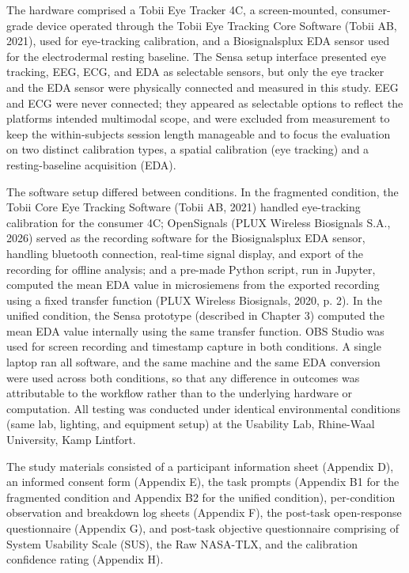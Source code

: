 \documentclass[
]{article}
\begin{document}
The hardware comprised a Tobii Eye Tracker 4C, a screen-mounted, consumer-grade device operated through the Tobii Eye Tracking Core Software (Tobii AB, 2021), used for eye-tracking calibration, and a Biosignalsplux EDA sensor used for the electrodermal resting baseline. The Sensa setup interface presented eye tracking, EEG, ECG, and EDA as selectable sensors, but only the eye tracker and the EDA sensor were physically connected and measured in this study. EEG and ECG were never connected; they appeared as selectable options to reflect the platform\textquotesingle s intended multimodal scope, and were excluded from measurement to keep the within-subjects session length manageable and to focus the evaluation on two distinct calibration types, a spatial calibration (eye tracking) and a resting-baseline acquisition (EDA).

The software setup differed between conditions. In the fragmented condition, the Tobii Core Eye Tracking Software (Tobii AB, 2021) handled eye-tracking calibration for the consumer 4C; OpenSignals (PLUX Wireless Biosignals S.A., 2026) served as the recording software for the Biosignalsplux EDA sensor, handling bluetooth connection, real-time signal display, and export of the recording for offline analysis; and a pre-made Python script, run in Jupyter, computed the mean EDA value in microsiemens from the exported recording using a fixed transfer function (PLUX Wireless Biosignals, 2020, p. 2). In the unified condition, the Sensa prototype (described in Chapter 3) computed the mean EDA value internally using the same transfer function. OBS Studio was used for screen recording and timestamp capture in both conditions. A single laptop ran all software, and the same machine and the same EDA conversion were used across both conditions, so that any difference in outcomes was attributable to the workflow rather than to the underlying hardware or computation. All testing was conducted under identical environmental conditions (same lab, lighting, and equipment setup) at the Usability Lab, Rhine-Waal University, Kamp Lintfort.

The study materials consisted of a participant information sheet (Appendix D), an informed consent form (Appendix E), the task prompts (Appendix B1 for the fragmented condition and Appendix B2 for the unified condition), per-condition observation and breakdown log sheets (Appendix F), the post-task open-response questionnaire (Appendix G), and post-task objective questionnaire comprising of System Usability Scale (SUS), the Raw NASA-TLX, and the calibration confidence rating (Appendix H).
\end{document}
